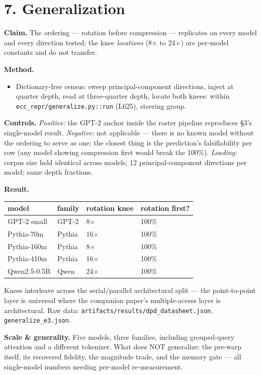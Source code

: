 \documentclass[10pt]{article}
\begin{document}
\section{7. Generalization}

\textbf{Claim.} The ordering --- rotation before compression --- replicates on every model and every
direction tested; the knee \emph{locations} (8$\times$ to 24$\times$) are per-model constants and do not transfer.

\textbf{Method.}
\begin{itemize}\setlength\itemsep{1pt}
\item Dictionary-free census: sweep principal-component directions, inject at quarter depth, read at three-quarter depth, locate both knees: within \texttt{ecc\_repr/generalize.py::run} (L625), steering group.
\end{itemize}
\textbf{Controls.} \emph{Positive:} the GPT-2 anchor inside the roster pipeline reproduces §3's single-model
result. \emph{Negative:} not applicable --- there is no known model without the ordering to serve as one;
the closest thing is the prediction's falsifiability per row (any model showing compression first
would break the 100\%). \emph{Loading:} corpus size held identical across models; 12 principal-component
directions per model; same depth fractions.

\textbf{Result.}

\begin{center}\small\begin{tabular}{llll}
\toprule
model & family & rotation knee & rotation first? \\
\midrule
GPT-2 small & GPT-2 & 8$\times$ & 100\% \\
Pythia-70m & Pythia & 16$\times$ & 100\% \\
Pythia-160m & Pythia & 8$\times$ & 100\% \\
Pythia-410m & Pythia & 16$\times$ & 100\% \\
Qwen2.5-0.5B & Qwen & 24$\times$ & 100\% \\
\bottomrule
\end{tabular}\end{center}

Knees interleave across the serial/parallel architectural split --- the point-to-point layer is
universal where the companion paper's multiple-access layer is architectural. Raw data:
\texttt{artifacts/results/dpd\_datasheet.json}, \texttt{generalize\_e3.json}.

\textbf{Scale \& generality.} Five models, three families, including grouped-query attention and a
different tokenizer. What does NOT generalize: the pre-warp itself, its recovered fidelity, the
magnitude trade, and the memory gate --- all single-model numbers needing per-model re-measurement.
\end{document}
